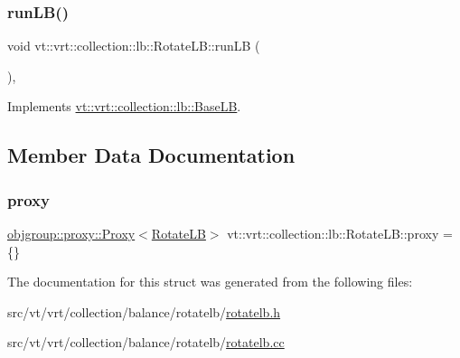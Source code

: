 \mbox{\label{structvt_1_1vrt_1_1collection_1_1lb_1_1_rotate_l_b_a853cb29e5dbe8164ad96a33fade9cc44}} 
\subsubsection{\texorpdfstring{run\+L\+B()}{runLB()}}
{\footnotesize\ttfamily void vt\+::vrt\+::collection\+::lb\+::\+Rotate\+L\+B\+::run\+LB (\begin{DoxyParamCaption}{ }\end{DoxyParamCaption})\hspace{0.3cm}{\ttfamily [override]}, {\ttfamily [virtual]}}



Implements \hyperlink{structvt_1_1vrt_1_1collection_1_1lb_1_1_base_l_b_a69a398c54f8129f365171a1189ffcd84}{vt\+::vrt\+::collection\+::lb\+::\+Base\+LB}.



\subsection{Member Data Documentation}
\mbox{\label{structvt_1_1vrt_1_1collection_1_1lb_1_1_rotate_l_b_aa181cbc42ae451bee43dacdddd708560}} 
\subsubsection{\texorpdfstring{proxy}{proxy}}
{\footnotesize\ttfamily \hyperlink{structvt_1_1objgroup_1_1proxy_1_1_proxy}{objgroup\+::proxy\+::\+Proxy}$<$\hyperlink{structvt_1_1vrt_1_1collection_1_1lb_1_1_rotate_l_b}{Rotate\+LB}$>$ vt\+::vrt\+::collection\+::lb\+::\+Rotate\+L\+B\+::proxy = \{\}\hspace{0.3cm}{\ttfamily [private]}}



The documentation for this struct was generated from the following files\+:\begin{DoxyCompactItemize}
\item 
src/vt/vrt/collection/balance/rotatelb/\hyperlink{rotatelb_8h}{rotatelb.\+h}\item 
src/vt/vrt/collection/balance/rotatelb/\hyperlink{rotatelb_8cc}{rotatelb.\+cc}\end{DoxyCompactItemize}
